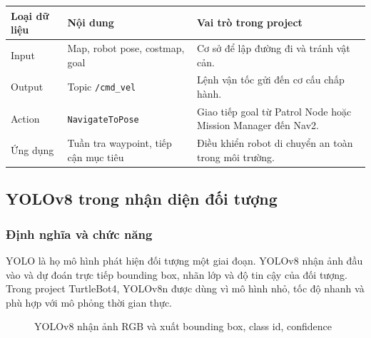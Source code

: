 \renewcommand{\arraystretch}{1.25}
\begin{longtable}{|
  >{\raggedright\arraybackslash}p{}|
  >{\raggedright\arraybackslash}p{}|
  >{\raggedright\arraybackslash}p{}|}
\hline
\textbf{Loại dữ liệu} & \textbf{Nội dung} & \textbf{Vai trò trong project} \\ \hline
\hline
\endhead
\hline
\endlastfoot
Input & Map, robot pose, costmap, goal & Cơ sở để lập đường đi và tránh
vật cản. \\ \hline
Output & Topic \texttt{/cmd\_vel} & Lệnh vận tốc gửi đến cơ cấu chấp
hành. \\ \hline
Action & \texttt{NavigateToPose} & Giao tiếp goal từ Patrol Node hoặc
Mission Manager đến Nav2. \\ \hline
Ứng dụng & Tuần tra waypoint, tiếp cận mục tiêu & Điều khiển robot di
chuyển an toàn trong môi trường. \\ \hline
\end{longtable}

\subsection{YOLOv8 trong nhận diện đối tượng}\label{subsec:yolov8}

\subsubsection{Định nghĩa và chức năng}

YOLO là họ mô hình phát hiện đối tượng một giai đoạn. YOLOv8 nhận ảnh
đầu vào và dự đoán trực tiếp bounding box, nhãn lớp và độ tin cậy của
đối tượng. Trong project TurtleBot4, YOLOv8n được dùng vì mô hình nhỏ,
tốc độ nhanh và phù hợp với mô phỏng thời gian thực.

\begin{figure}[H]
\centering
{}
\caption{YOLOv8 nhận ảnh RGB và xuất bounding box, class id, confidence}
\label{fig:yolo-flow}
\end{figure}

